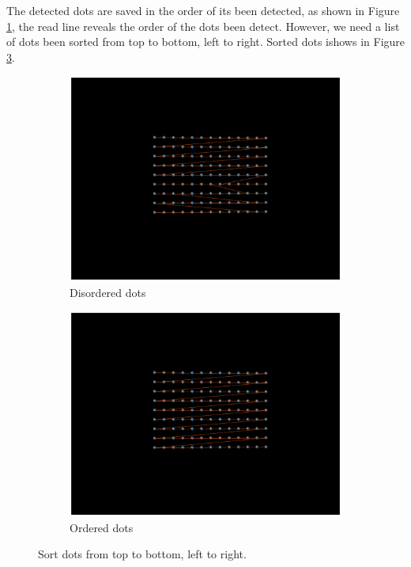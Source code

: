 The detected dots are saved in the order of its been detected, as shown in Figure \ref{fig:dot_disorder}, the read line reveals the order of the dots been detect. However, we need a list of dots been sorted from top to bottom, left to right. Sorted dots ishows in Figure \ref{fig:dot_ordered}.

\begin{figure}[h!]
	\centering
	\begin{subfigure}[t]{0.48\linewidth}
		\centering
		\includegraphics[width=1\linewidth]{figures/part2/dot_disorder.eps}
		\caption{Disordered dots}
		\label{fig:dot_disorder}
	\end{subfigure}
	\begin{subfigure}[t]{0.48\linewidth}
		\centering
		\includegraphics[width=1\linewidth]{figures/part2/dot_ordered.eps}
		\caption{Ordered dots}
		\label{fig:dot_ordered}
	\end{subfigure}
	\caption{Sort dots from top to bottom, left to right.}
\end{figure}

